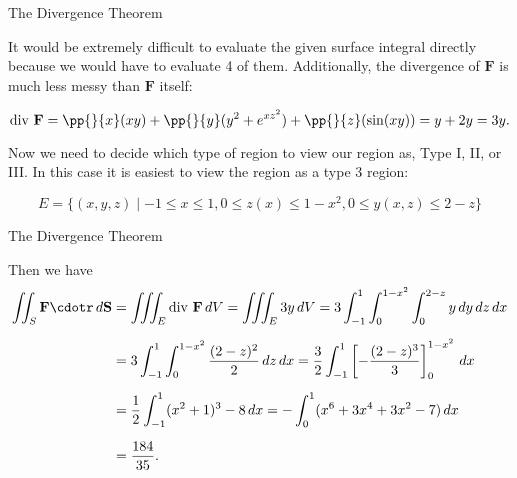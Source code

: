 \documentclass[11pt,english,
handout
]{beamer}
\begin{document}
\begin{frame}[t]{The Divergence Theorem}
\small
\begin{example}
It would be extremely difficult to evaluate the given surface integral directly because we would have to evaluate 4 of them. \pause Additionally, the divergence of $\mathbf{F}$ is much less messy than $\mathbf{F}$ itself:

\[
\text{div }\mathbf{F}=\pp{}{x}(xy)+\pp{}{y}(y^2+e^{xz^2})+\pp{}{z}(\sin(xy))=y+2y=3y.
\]\pause 

Now we need to decide which type of region to view our region as, Type I, II, or III. \pause In this case it is easiest to view the region as a type 3 region:

\[
E=\{(x,y,z)\mid-1\leq x\leq 1,0\leq z(x)\leq 1-x^2,0\leq y(x,z)\leq 2-z\}
\]
\end{example}
\end{frame}









\begin{frame}[t]{The Divergence Theorem}
\small
\begin{example}
Then we have
\begin{align*}
\iint_S\mathbf{F}\cdotr\,d\mathbf{S}&=\iiint_E\text{div }\mathbf{F}\,dV=\iiint_E3y\,dV=3\int_{-1}^1\int_0^{1-x^2}\int_0^{2-z}y\,dy\,dz\,dx\\[2mm]
&=3\int_{-1}^1\int_0^{1-x^2}\frac{(2-z)^2}{2}\,dz\,dx=\frac{3}{2}\int_{-1}^1\left[-\frac{(2-z)^3}{3}\right]_0^{1-x^2}\,dx\\[2mm]
&=\frac{1}{2}\int_{-1}^1(x^2+1)^3-8\,dx=-\int_0^1(x^6+3x^4+3x^2-7)\,dx\\[2mm]
&=\frac{184}{35}.
\end{align*}
\end{example}
\end{frame}
\end{document}
